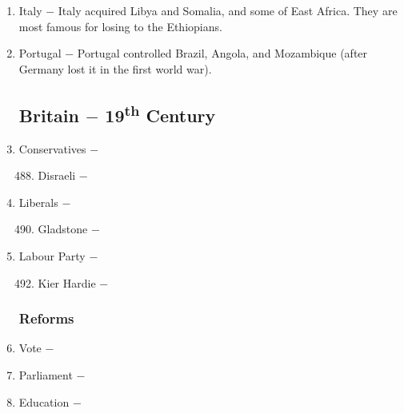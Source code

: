 \documentclass[12pt]{article}
\begin{document}
\begin{enumerate}
\item Italy $-$ Italy acquired Libya and Somalia, and some of East Africa. They are most famous for losing to the Ethiopians.

\item Portugal $-$ Portugal controlled Brazil, Angola, and Mozambique (after Germany lost it in the first world war).

\subsection{Britain $-$ 19\textsuperscript{th} Century}

\item Conservatives $-$  

\begin{enumerate}[label=\arabic{*}.]
\setcounter{enumii}{487}

\item Disraeli $-$ 

\end{enumerate}
\setcounter{enumi}{488}

\item Liberals $-$ 

\begin{enumerate}[label=\arabic{*}.]
\setcounter{enumii}{489}

\item Gladstone $-$

\end{enumerate}
\setcounter{enumi}{490}

\item Labour Party $-$

\begin{enumerate}[label=\arabic{*}.]
\setcounter{enumii}{491}

\item Kier Hardie $-$ 

\end{enumerate}
\setcounter{enumi}{492}

\subsubsection{Reforms}

\item Vote $-$ 

\item Parliament $-$ 

\item Education $-$ 


\end{enumerate}
\end{document}
